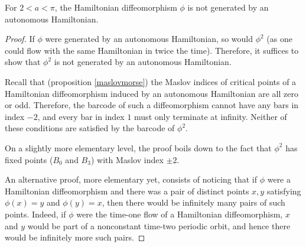 \begin{corollary}
For $2 < a < \pi$, the Hamiltonian diffeomorphism $\phi$ is not generated by an autonomous Hamiltonian.
\end{corollary}

\begin{proof}
If $\phi$ were generated by an autonomous Hamiltonian, so would $\phi^2$ (as one could flow with the same Hamiltonian in twice the time). Therefore, it suffices to show that $\phi^2$ is not generated by an autonomous Hamiltonian.

Recall that (proposition \ref{maslovmorse}) the Maslov indices of critical points of a Hamiltonian diffeomorphism induced by an autonomous Hamiltonian are all zero or odd. Therefore, the barcode of such a diffeomorphism cannot have any bars in index $-2$, and every bar in index $1$ must only terminate at infinity. Neither of these conditions are satisfied by the barcode of $\phi^2$.

On a slightly more elementary level, the proof boils down to the fact that $\phi^2$ has fixed points ($B_0$ and $B_3$) with Maslov index $\pm 2$.

An alternative proof, more elementary yet, consists of noticing that if $\phi$ were a Hamiltonian diffeomorphism and there was a pair of distinct points $x, y$ satisfying $\phi(x) = y$ and $\phi(y) = x$, then there would be infinitely many pairs of such points. Indeed, if $\phi$ were the time-one flow of a Hamiltonian diffeomorphism, $x$ and $y$ would be part of a nonconstant time-two periodic orbit, and hence there would be infinitely more such pairs.
\end{proof}

